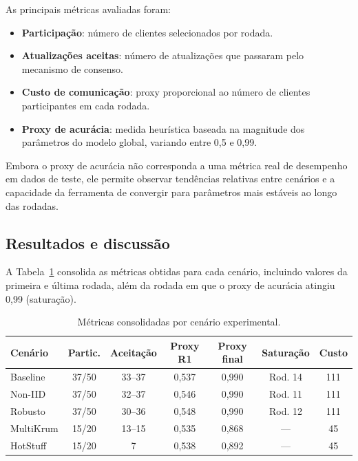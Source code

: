 \documentclass[12pt]{article}
\begin{document}
As principais métricas avaliadas foram:
\begin{itemize}
  \item \textbf{Participação}: número de clientes selecionados por rodada.
  \item \textbf{Atualizações aceitas}: número de atualizações que passaram pelo mecanismo de consenso.
  \item \textbf{Custo de comunicação}: proxy proporcional ao número de clientes participantes em cada rodada.
  \item \textbf{Proxy de acurácia}: medida heurística baseada na magnitude dos parâmetros do modelo global, variando entre 0,5 e 0,99.
\end{itemize}

Embora o proxy de acurácia não corresponda a uma métrica real de desempenho em dados de teste, ele permite observar tendências relativas entre cenários e a capacidade da ferramenta de convergir para parâmetros mais estáveis ao longo das rodadas.

\subsection{Resultados e discussão}

A Tabela~\ref{tab:resultados} consolida as métricas obtidas para cada cenário, incluindo valores da primeira e última rodada, além da rodada em que o proxy de acurácia atingiu 0,99 (saturação).

\begin{table}[!ht]
\centering
\caption{Métricas consolidadas por cenário experimental.}\label{tab:resultados}
\begin{tabular}{lcccccc}
\hline
\textbf{Cenário} & \textbf{Partic.} & \textbf{Aceitação} & \textbf{Proxy R1} & \textbf{Proxy final} & \textbf{Saturação} & \textbf{Custo} \\
\hline
Baseline    & 37/50 & 33--37 & 0,537 & 0,990 & Rod. 14 & 111 \\
Non-IID     & 37/50 & 32--37 & 0,546 & 0,990 & Rod. 11 & 111 \\
Robusto     & 37/50 & 30--36 & 0,548 & 0,990 & Rod. 12 & 111 \\
MultiKrum   & 15/20 & 13--15 & 0,535 & 0,868 & --- & 45 \\
HotStuff    & 15/20 & 7      & 0,538 & 0,892 & --- & 45 \\
\hline
\end{tabular}
\end{table}
\end{document}
